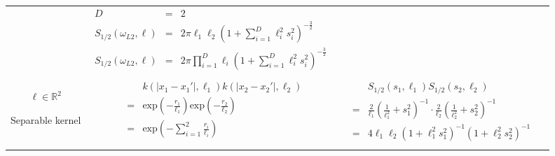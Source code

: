 \documentclass[onecolumn,a4paper,11pt]{article}
\begin{document}
\begin{landscape}
\begin{table}[H]
\begin{center}
\begin{tabular}{|c|c|c|c|}
       & \multicolumn{1}{|p{8.2cm}|}{\small
         \begin{eqnarray*}
		D &=& 2\\
		S_{1/2}(\omega_{L2},\bm{\ell}) &=& 2\pi\ell_1\ell_2 \left( 1+ \sum_{i=1}^{D}\ell_i^2 s_i^2 \right)^{-\frac{3}{2}}\\
		S_{1/2}(\omega_{L2},\bm{\ell}) &=& 2\pi\prod_{i=1}^{D}\ell_i \left( 1+ \sum_{i=1}^{D}\ell_i^2 s_i^2 \right)^{-\frac{3}{2}}
         \end{eqnarray*}
        }
        
       & \multicolumn{1}{|p{6.2cm}|}{\small

       } \\  
       \vspace{-8mm}\\
       \cline{1-3}
       
       \multicolumn{1}{|p{1.5cm}|}{
       \vspace{1mm}
       $\bm{\ell} \in \mathbb{R}^2$
       
       {Separable kernel} 
       }
       
        & \multicolumn{1}{|p{7.2cm}|}{\small
         \begin{eqnarray*}
		&&k(|x_1-x_1'|,\ell_1)k(|x_2-x_2'|,\ell_2) \\
		&=& \mathrm{exp}\left(- \frac{r_1}{\ell_1} \right) \mathrm{exp}\left(- \frac{r_2}{\ell_2} \right) \\
		&=& \mathrm{exp}\left(- \sum_{i=1}^{2}\frac{r_i}{\ell_i} \right)
         \end{eqnarray*}
       }
       
       & \multicolumn{1}{|p{8.2cm}|}{\small
         \begin{eqnarray*}
         &&S_{1/2}(s_1,\ell_1)S_{1/2}(s_2,\ell_2) \\
		&=& \frac{2}{\ell_1}\left(\frac{1}{\ell_1^2}+s_1^2 \right)^{-1} \cdot \frac{2}{\ell_2}\left(\frac{1}{\ell_2^2}+s_2^2 \right)^{-1} \\
		&=& 4\ell_1\ell_2\left(1+\ell_1^2s_1^2 \right)^{-1} \left(1+\ell_2^2s_2^2 \right)^{-1} \\
         \end{eqnarray*}        
       } 

       & \multicolumn{1}{|p{6.2cm}|}{\small

       } \\ 
       
       \hline
    \end{tabular}
  \end{center}
\end{table}



\end{landscape}
\end{document}
